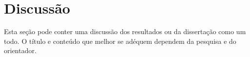 \chapter{Discussão}
\label{chp:discussao}

Esta seção pode conter uma discussão dos resultados ou da dissertação como um todo. O título e conteúdo que melhor se adéquem dependem da pesquisa e do orientador. \lipsum[4]